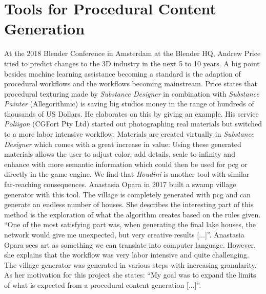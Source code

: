 \documentclass[10pt,a4paper]{article}
\begin{document}
\section{Tools for Procedural Content Generation}
\begin{multicols}{2}
At the 2018 Blender Conference in Amsterdam at the Blender HQ, Andrew Price tried to predict changes to the 3D industry in the next 5 to 10 years. A big point besides machine learning assistance becoming a standard is the adaption of procedural workflows and the workflows becoming mainstream\cite{Price2018}. Price states that procedural texturing made by \textit{Substance Designer} in combination with \textit{Substance Painter} (Allegorithmic) is saving big studios money in the range of hundreds of thousands of US Dollars. He elaborates on this by giving an example. His service \textit{Poliigon} (CGFort Pty Ltd) started out photographing real materials but switched to a more labor intensive workflow. Materials are created virtually in \textit{Substance Designer} which comes with a great increase in value: Using these generated materials allows the user to adjust color, add details, scale to infinity and enhance with more semantic information which could then be used for \gls{pcg} or directly in the game engine. We find that \textit{Houdini} is another tool with similar far-reaching consequences. Anastasia Opara in 2017 built a swamp village generator with this tool. The village is completely generated with \gls{pcg} and can generate an endless number of houses. She describes the interesting part of this method is the exploration of what the algorithm creates based on the rules given. “One of the most satisfying part was, when generating the final lake houses, the network would give me unexpected, but very creative results [...]”\cite{Opara2016}. Anastasia Opara sees art as something we can translate into computer language. However, she explains that the workflow was very labor intensive and quite challenging. The village generator was generated in various steps with increasing granularity. As her motivation for this project she states: “My goal was to expand the limits of what is expected from a procedural content generation [...]”\cite{Opara2017}.
\end{multicols}
\end{document}
